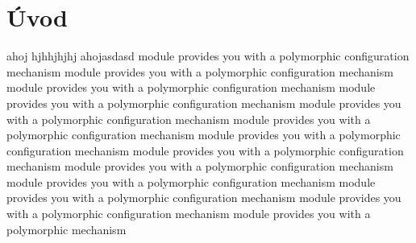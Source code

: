 

\chapter{Úvod}
ahoj
hjhhjhjhj
ahojasdasd
module provides you with a polymorphic configuration mechanism module provides you with a polymorphic configuration mechanism module provides you with a polymorphic configuration mechanism module provides you with a polymorphic configuration mechanism module provides you with a polymorphic configuration mechanism module provides you with a polymorphic configuration mechanism module provides you with a polymorphic configuration mechanism module provides you with a polymorphic configuration mechanism module provides you with a polymorphic configuration mechanism module provides you with a polymorphic configuration mechanism module provides you with a polymorphic configuration mechanism module provides you with a polymorphic configuration mechanism module provides you with a polymorphic  mechanism 



\cite{Turecek2011S45}